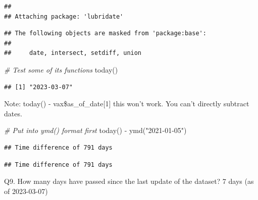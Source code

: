 \documentclass[
]{article}
\newenvironment{Shaded}{\begin{snugshade}}{\end{snugshade}}
\newcommand{\CommentTok}[1]{\textcolor[rgb]{0.56,0.35,0.01}{\textit{#1}}}
\newcommand{\DecValTok}[1]{\textcolor[rgb]{0.00,0.00,0.81}{#1}}
\newcommand{\FunctionTok}[1]{\textcolor[rgb]{0.00,0.00,0.00}{#1}}
\newcommand{\NormalTok}[1]{#1}
\newcommand{\OtherTok}[1]{\textcolor[rgb]{0.56,0.35,0.01}{#1}}
\newcommand{\SpecialCharTok}[1]{\textcolor[rgb]{0.00,0.00,0.00}{#1}}
\newcommand{\StringTok}[1]{\textcolor[rgb]{0.31,0.60,0.02}{#1}}
\begin{document}
\begin{verbatim}
## 
## Attaching package: 'lubridate'
\end{verbatim}

\begin{verbatim}
## The following objects are masked from 'package:base':
## 
##     date, intersect, setdiff, union
\end{verbatim}

\begin{Shaded}
\begin{Highlighting}[]
\CommentTok{\# Test some of its functions}
\FunctionTok{today}\NormalTok{()}
\end{Highlighting}
\end{Shaded}

\begin{verbatim}
## [1] "2023-03-07"
\end{verbatim}

Note: today() - vax\$as\_of\_date{[}1{]} this won't work. You can't
directly subtract dates.

\begin{Shaded}
\begin{Highlighting}[]
\CommentTok{\# Put into ymd() format first}
\FunctionTok{today}\NormalTok{() }\SpecialCharTok{{-}} \FunctionTok{ymd}\NormalTok{(}\StringTok{"2021{-}01{-}05"}\NormalTok{)}
\end{Highlighting}
\end{Shaded}

\begin{verbatim}
## Time difference of 791 days
\end{verbatim}

\begin{Shaded}
\end{Shaded}

\begin{verbatim}
## Time difference of 791 days
\end{verbatim}

Q9. How many days have passed since the last update of the dataset? 7
days (as of 2023-03-07)
\end{document}
